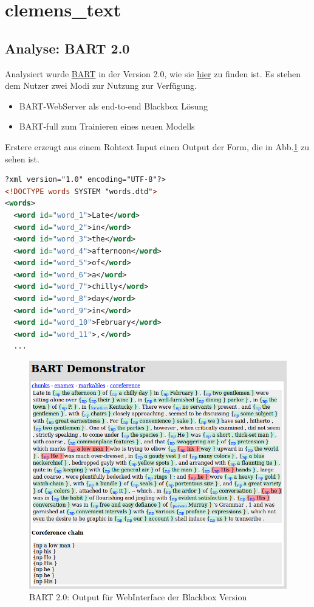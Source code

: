 \section{clemens\_text}\label{clemens_text} %
 
\subsection{Analyse: BART 2.0}

Analysiert wurde \href{http://www.bart-anaphora.org/}{BART} in der Version 2.0, 
wie sie \href{http://www.bart-anaphora.org/release/bart-2.0.tar.gz}{hier} zu finden ist.
Es stehen dem Nutzer zwei Modi zur Nutzung zur Verfügung.
\begin{itemize}
\item BART-WebServer als end-to-end Blackbox Lösung
\item BART-full zum Trainieren eines neuen Modells
\end{itemize}
Erstere erzeugt aus einem Rohtext Input einen Output der Form, 
die in Abb.\ref{bart_webUI_output} zu sehen ist.

\begin{lstlisting}[language=xml]
?xml version="1.0" encoding="UTF-8"?>
<!DOCTYPE words SYSTEM "words.dtd">
<words>
  <word id="word_1">Late</word>
  <word id="word_2">in</word>
  <word id="word_3">the</word>
  <word id="word_4">afternoon</word>
  <word id="word_5">of</word>
  <word id="word_6">a</word>
  <word id="word_7">chilly</word>
  <word id="word_8">day</word>
  <word id="word_9">in</word>
  <word id="word_10">February</word>
  <word id="word_11">,</word>
  ...
  \end{lstlisting}


\begin{figure}[ht]
\begin{center}
\includegraphics[width=12cm]{./img/cle/bart_webUI_output.png}
\caption{BART 2.0: Output für WebInterface der Blackbox Version}
\label{bart_webUI_output}
\end{center}
\end{figure}




